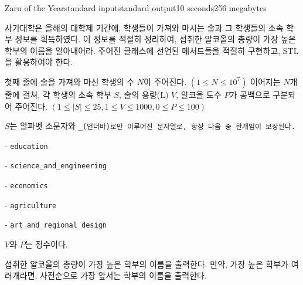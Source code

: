 \begin{problem}{Zaru of the Year}{standard input}{standard output}{10 seconds}{256 megabytes}

사가대학은 올해의 대학제 기간에, 학생들이 가져와 마시는 술과 그 학생들의 소속 학부 정보를 획득하였다. 이 정보를 적절히 정리하여, 섭취한 알코올의 총량이 가장 높은 학부의 이름을 알아내어라. 주어진 클래스에 선언된 메서드들을 적절히 구현하고, STL을 활용하여야 한다.

\InputFile
첫째 줄에 술을 가져와 마신 학생의 수 $N$이 주어진다. $(1 \le N \le 10^7)$
이어지는 $N$개 줄에 걸쳐, 각 학생의 소속 학부 $S$, 술의 용량(L) $V$, 알코올 도수 $P$가 공백으로 구분되어 주어진다. $(1 \le |S| \le 25, 1 \le V \le 1000, 0 \le P \le 100)$

$S$는 알파벳 소문자와 \tt{_}(언더바)로만 이루어진 문자열로, 항상 다음 중 한개임이 보장된다.

- \tt{education}

- \tt{science_and_engineering}

- \tt{economics}

- \tt{agriculture}

- \tt{art_and_regional_design}

$V$와 $P$는 정수이다.

\OutputFile
섭취한 알코올의 총량이 가장 높은 학부의 이름을 출력한다. 만약, 가장 높은 학부가 여러개라면, 사전순으로 가장 앞서는 학부의 이름을 출력한다.


\end{problem}

